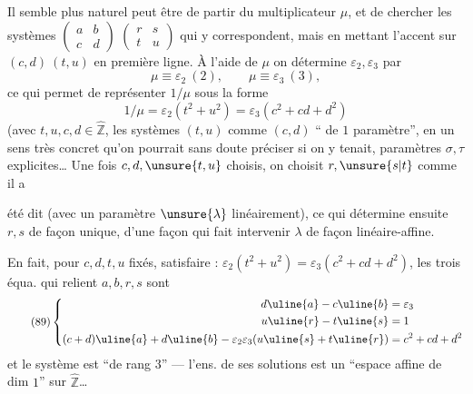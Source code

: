 Il semble plus naturel peut être de partir du multiplicateur $\mu$, et de
chercher les systèmes
$\begin{pmatrix}a&b\\c&d\end{pmatrix}$
$\begin{pmatrix}r&s\\t&u\end{pmatrix}$ qui y correspondent,
mais en mettant l'accent sur $(c,d)\ (t,u)$ en première ligne.
À l'aide de $\mu$ on détermine $\varepsilon_2,\varepsilon_3$ par
\[
\mu\equiv\varepsilon_2\ (2),\qquad
\mu\equiv\varepsilon_3\ (3),
\]
 ce qui permet de  représenter
$1/\mu$ sous la forme
\[
1/\mu=\varepsilon_2(t^2+u^2)=\varepsilon_3(c^2+cd+d^2)
\]
(avec $t,u,c,d\in\widehat{\mathbb Z}$, les systèmes $(t,u)$ comme
$(c,d)$ `` de $1$ paramètre'', 
en un sens très concret qu'on pourrait sans doute préciser si on y tenait,
paramètres  $\sigma,\tau$ explicites\ldots{} Une
fois $c,d,\unsure{t,u}$ choisis, on choisit $r,\unsure{s|t}$ comme il a



été dit (avec un paramètre $\unsure{\lambda}$ 
linéairement), ce qui détermine ensuite $r,s$ de façon unique, d'une façon
qui fait intervenir $\lambda$  de façon
linéaire-affine.

En fait, pour $c,d,t,u$ 
fixés, 
satisfaire : $\varepsilon_2(t^2+u^2)=\varepsilon_3(c^2+cd+d^2)$,
les trois équa. qui relient $a,b,r,s$ sont 
\[
\tag{89}
\left\{\begin{aligned}
d\uline{a}-c\uline{b}&=\varepsilon_3\\
u\uline{r}-t\uline{s}&=1\\
(c+d)\uline{a}+d\uline{b}
-\varepsilon_2\varepsilon_3(u\uline{s}+t\uline{r})&=c^2+cd+d^2
\end{aligned}\right.
\]
et le  système est ``de rang $3$''
--- l'ens. de ses solutions est un ``espace affine de dim $1$''
sur $\widehat{\mathbb Z}$\ldots

